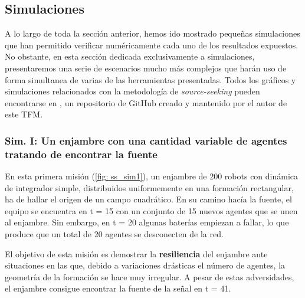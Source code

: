 
\subsection{Simulaciones}

A lo largo de toda la sección anterior, hemos ido mostrado pequeñas simulaciones que han permitido verificar numéricamente cada uno de los resultados expuestos. No obstante, en esta sección dedicada exclusivamente a simulaciones, presentaremos una serie de escenarios mucho más complejos que harán uso de forma simultanea de varias de las herramientas presentadas. Todos los gráficos y simulaciones relacionados con la metodología de \textit{source-seeking} pueden encontrarse en \cite{repo_ss}, un repositorio de GitHub creado y mantenido por el autor de este TFM.

\newpage

\subsubsection*{Sim. I: Un enjambre con una cantidad variable de agentes tratando de encontrar la fuente}

En esta primera misión (\autoref{fig: ss_sim1}), un enjambre de 200 robots con dinámica de integrador simple, distribuidos uniformemente en una formación rectangular, ha de hallar el origen de un campo cuadrático. En su camino hacía la fuente, el equipo se encuentra en t = 15 con un conjunto de 15 nuevos agentes que se unen al enjambre. Sin embargo, en t = 20 algunas baterías empiezan a fallar, lo que produce que un total de 20 agentes se desconecten de la red.

El objetivo de esta misión es demostrar la \textbf{resiliencia} del enjambre ante situaciones en las que, debido a variaciones drásticas el número de agentes, la geometría de la formación se hace muy irregular. A pesar de estas adversidades, el enjambre consigue encontrar la fuente de la señal en t = 41.

